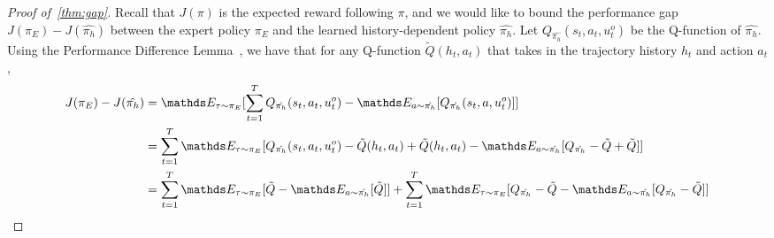 \begin{proof}[Proof of~\cref{thm:gap}]
Recall that $J(\pi)$ is the expected reward following $\pi$, and we would like to bound the performance gap $J(\pi_E)-J(\hat{\pi_h})$ between the expert policy $\pi_E$ and the learned history-dependent policy $\hat{\pi_h}$. Let $Q_{\hat{\pi_h}}(s_t,a_t,u^o_t)$ be the Q-function of $\hat{\pi_h}$. Using the Performance Difference Lemma~\citep{Kakade2002}, we have that for any Q-function $\tilde{Q}(h_t,a_t)$ that takes in the trajectory history $h_t$ and action $a_t$,
\begin{align}
J(\pi_E)-J(\hat{\pi_h})&=\expectE_{\tau\sim\pi_E}[\sum_{t=1}^T Q_{\hat{\pi_h}}(s_t,a_t,u^o_t)-\expectE_{a\sim\hat{\pi_h}}[Q_{\hat{\pi_h}}(s_t,a,u^o_t)]]\nonumber\\
&=\sum_{t=1}^T\expectE_{\tau\sim\pi_E}[Q_{\hat{\pi_h}}(s_t,a_t,u^o_t)-\tilde{Q}(h_t,a_t)+\tilde{Q}(h_t,a_t)-\expectE_{a\sim{\hat{\pi_h}}}[Q_{\hat{\pi_h}}-\tilde{Q}+\tilde{Q}]]\nonumber\\
&=\sum_{t=1}^T \expectE_{\tau\sim\pi_E}[\tilde{Q}-\expectE_{a\sim\hat{\pi_h}}[\tilde{Q}]]+\sum_{t=1}^T \expectE_{\tau\sim\pi_E}[Q_{\hat{\pi_h}}-\tilde{Q}-\expectE_{a\sim\hat{\pi_h}}[Q_{\hat{\pi_h}}-\tilde{Q}]]\label{eq:pdl}
\end{align}



\end{proof}
